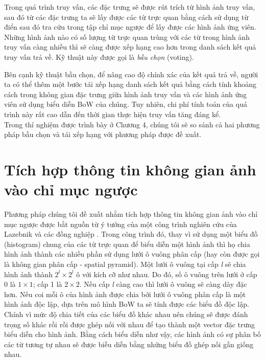 Trong quá trình truy vấn, các đặc trưng sẽ được rút trích từ hình ảnh truy vấn, sau đó từ các đặc trưng ta sẽ lấy được các từ trực quan bằng cách sử dụng từ điển sau đó tra cứu trong tập chỉ mục ngược để lấy được các hình ảnh ứng viên. Những hình ảnh nào có số lượng từ trực quan trùng với các từ trong hình ảnh truy vấn càng nhiều thì sẽ càng được xếp hạng cao hơn trong danh sách kết quả truy vấn trả về. Kỹ thuật này được gọi là \textit{bầu chọn} (voting).

Bên cạnh kỹ thuật bầu chọn, để nâng cao độ chính xác của kết quả trả về, người ta có thể thêm một bước tái xếp hạng danh sách kết quả bằng cách tính khoảng cách trong không gian đặc trưng giữa hình ảnh truy vấn và các hình ảnh ứng viên sử dụng biểu diễn BoW của chúng. Tuy nhiên, chi phí tính toán của quá trình này rất cao dẫn đến thời gian thực hiện truy vấn tăng đáng kể.\\

Trong thí nghiệm được trình bày ở Chương 4, chúng tôi sẽ so sánh cả hai phương pháp bầu chọn và tái xếp hạng với phương pháp được đề xuất.\\

\section{Tích hợp thông tin không gian ảnh vào chỉ mục ngược}
Phương pháp chúng tôi đề xuất nhằm tích hợp thông tin không gian ảnh vào chỉ mục ngược được bắt nguồn từ ý tưởng của một công trình nghiên cứu của Lazebnik và các đồng nghiệp \cite{lazebnik2006beyond}. Trong công trình đó, thay vì sử dụng một biểu đồ (histogram) chung  của các từ trực quan để biểu diễn một hình ảnh thì họ chia hình ảnh thành các nhiều phần sử dụng lưới ô vuông phân cấp (hay còn được gọi là không gian phân cấp - spatial pyramid). Một lưới ô vuông tại cấp \textit{l} sẽ chia hình ảnh thành $2^l \times 2^l$ ô với kích cỡ như nhau. Do đó, số ô vuông trên lưới ở cấp 0 là $1 \times 1$; cấp 1 là $2 \times 2$. Nếu cấp \textit{l} càng cao thì lưới ô vuông sẽ càng dày đặc hơn. Nếu coi mỗi ô của hình ảnh được chia bởi lưới ô vuông phân cấp là một hình ảnh độc lập, dựa trên mô hình BoW ta sẽ tính được các biểu đồ độc lập. Chính vì mức độ chia tiết của các biểu đồ khác nhau nên chúng sẽ được đánh trọng số khác rồi rồi được ghép nối với nhau để tạo thành một vector đặc trưng biểu diễn cho hình ảnh. Bằng cách biểu diễn như vậy, các hình ảnh có sự phân bố các từ tương tự nhau sẽ được biễu diễn bằng những biểu đồ ghép nối gần giống nhau.

